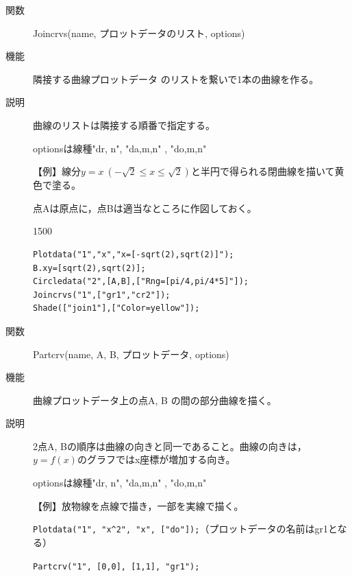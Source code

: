\documentclass[papersize,a4paper,10pt,uplatex]{jsarticle}
\begin{document}
\begin{description}
\vspace{\baselineskip}
\hypertarget{joincrvs}{}
\item[関数]Joincrvs(name, プロットデータのリスト, options) 
\item[機能]隣接する曲線プロットデータ のリストを繋いで1本の曲線を作る。
\item[説明]曲線のリストは隣接する順番で指定する。

optionsは線種"dr, n", "da,m,n" , "do,m,n"

\vspace{\baselineskip}
【例】線分$y=x\ (-\sqrt{2} \leq x \leq \sqrt{2})$と半円で得られる閉曲線を描いて黄色で塗る。

点Aは原点に，点Bは適当なところに作図しておく。

\begin{layer}{150}{0}
\end{layer}

\begin{verbatim}
Plotdata("1","x","x=[-sqrt(2),sqrt(2)]");
B.xy=[sqrt(2),sqrt(2)];
Circledata("2",[A,B],["Rng=[pi/4,pi/4*5]"]);
Joincrvs("1",["gr1","cr2"]);
Shade(["join1"],["Color=yellow"]);
\end{verbatim}
\vspace{5mm}

\vspace{\baselineskip}
\hypertarget{partcrv}{}
\item[関数]Partcrv(name, A, B, プロットデータ, options) 
\item[機能]曲線プロットデータ上の点A, B の間の部分曲線を描く。
\item[説明]2点A, Bの順序は曲線の向きと同一であること。曲線の向きは，$y=f(x)$のグラフではx座標が増加する向き。

optionsは線種"dr, n", "da,m,n" , "do,m,n"

\vspace{\baselineskip}
【例】放物線を点線で描き，一部を実線で描く。

\verb|Plotdata("1", "x^2", "x", ["do"]);|（プロットデータの名前はgr1となる）

\verb|Partcrv("1", [0,0], [1,1], "gr1");|

\begin{center}  \end{center}


\end{description}
\end{document}
